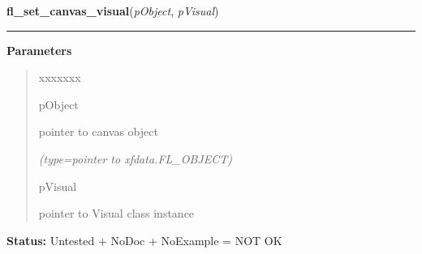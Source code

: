 \hspace{.8\funcindent}\begin{boxedminipage}{\funcwidth}

    \raggedright \textbf{fl\_set\_canvas\_visual}(\textit{pObject}, \textit{pVisual})

    \vspace{-1.5ex}

    \rule{\textwidth}{0.5\fboxrule}
\setlength{\parskip}{2ex}
\setlength{\parskip}{1ex}
      \textbf{Parameters}
      \vspace{-1ex}

      \begin{quote}
        \begin{Ventry}{xxxxxxx}

          \item[pObject]

          pointer to canvas object

            {\it (type=pointer to xfdata.FL\_OBJECT)}

          \item[pVisual]

          pointer to Visual class instance

        \end{Ventry}

      \end{quote}

\textbf{Status:} Untested + NoDoc + NoExample = NOT OK



    \end{boxedminipage}

    \label{xformslib:library:fl_set_canvas_depth}

    \vspace{0.5ex}

